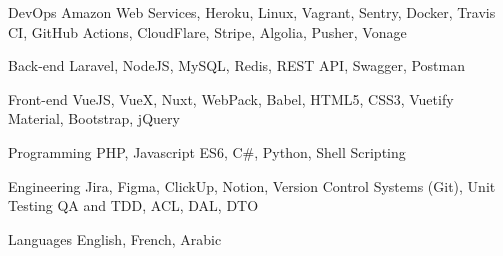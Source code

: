 

\begin{cvskills}

  \cvskill
    {DevOps} %
    {Amazon Web Services, Heroku, Linux, Vagrant, Sentry, Docker, Travis CI, GitHub Actions, CloudFlare, Stripe, Algolia, Pusher, Vonage} %

  \cvskill
    {Back-end} %
    {Laravel, NodeJS, MySQL, Redis, REST API, Swagger, Postman} %

  \cvskill
    {Front-end} %
    {VueJS, VueX, Nuxt, WebPack, Babel, HTML5, CSS3, Vuetify Material, Bootstrap, jQuery} %

  \cvskill
    {Programming} %
    {PHP, Javascript ES6, C\#, Python, Shell Scripting} %

  \cvskill
    {Engineering} %
    {Jira, Figma, ClickUp, Notion, Version Control Systems (Git), Unit Testing QA and TDD, ACL, DAL, DTO} %


  \cvskill
    {Languages} %
    {English, French, Arabic} %

\end{cvskills}
